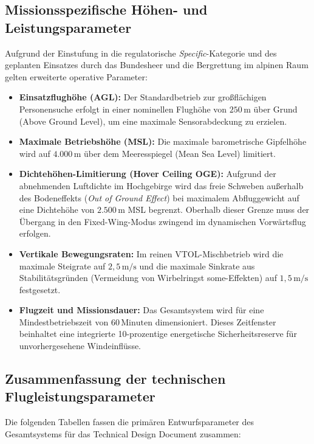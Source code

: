 \subsection{Missionsspezifische Höhen- und Leistungsparameter}
Aufgrund der Einstufung in die regulatorische \textit{Specific}-Kategorie und des geplanten Einsatzes durch das Bundesheer und die Bergrettung im alpinen Raum gelten erweiterte operative Parameter:
\begin{itemize}
    \item \textbf{Einsatzflughöhe (AGL):} Der Standardbetrieb zur großflächigen Personensuche erfolgt in einer nominellen Flughöhe von $250\,\text{m}$ über Grund (Above Ground Level), um eine maximale Sensorabdeckung zu erzielen.
    \item \textbf{Maximale Betriebshöhe (MSL):} Die maximale barometrische Gipfelhöhe wird auf $4.000\,\text{m}$ über dem Meeresspiegel (Mean Sea Level) limitiert. 
    \item \textbf{Dichtehöhen-Limitierung (Hover Ceiling OGE):} Aufgrund der abnehmenden Luftdichte im Hochgebirge wird das freie Schweben außerhalb des Bodeneffekts (\textit{Out of Ground Effect}) 
                                                                bei maximalem Abfluggewicht auf eine Dichtehöhe von $2.500\,\text{m}$ MSL begrenzt. Oberhalb dieser Grenze muss der Übergang in den Fixed-Wing-Modus zwingend im dynamischen Vorwärtsflug erfolgen.
    \item \textbf{Vertikale Bewegungsraten:} Im reinen VTOL-Mischbetrieb wird die maximale Steigrate auf $2{,}5\,\text{m/s}$ und die maximale Sinkrate aus Stabilitätsgründen (Vermeidung von Wirbelringst some-Effekten) auf $1{,}5\,\text{m/s}$ festgesetzt.
    \item \textbf{Flugzeit und Missionsdauer:} Das Gesamtsystem wird für eine Mindestbetriebszeit von $60\,\text{Minuten}$ dimensioniert. 
                                               Dieses Zeitfenster beinhaltet eine integrierte 10-prozentige energetische Sicherheitsreserve für unvorhergesehene Windeinflüsse.
\end{itemize}

\subsection{Zusammenfassung der technischen Flugleistungsparameter}
Die folgenden Tabellen fassen die primären Entwurfsparameter des Gesamtsystems für das Technical Design Document zusammen:

